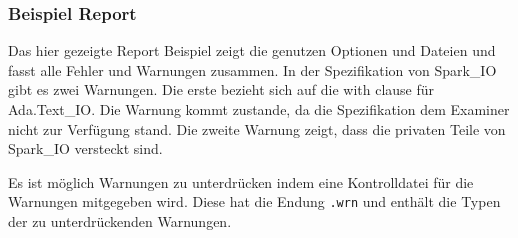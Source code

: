 \subsubsection{Beispiel Report}
Das hier gezeigte Report Beispiel zeigt die genutzen Optionen und Dateien und fasst alle Fehler und Warnungen zusammen. In der Spezifikation von Spark\_IO gibt es zwei Warnungen. Die erste bezieht sich auf die with clause für Ada.Text\_IO. Die Warnung kommt zustande, da die Spezifikation dem Examiner nicht zur Verfügung stand.
Die zweite Warnung zeigt, dass die privaten Teile von Spark\_IO versteckt sind.

Es ist möglich Warnungen zu unterdrücken indem eine Kontrolldatei für die Warnungen mitgegeben wird. Diese hat die Endung \texttt{.wrn} und enthält die Typen der zu unterdrückenden Warnungen.

